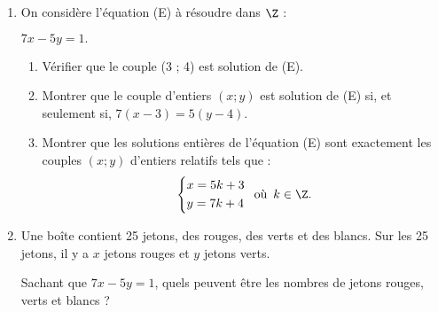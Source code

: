 \documentclass{cornouaille}
\begin{document}
\begin{exercice}
\begin{enumerate}
\item On considère l'équation (E) à résoudre dans $\Z$ :

{\centering $7x - 5y = 1.$\par}


\begin{enumerate}
\item Vérifier que le couple (3 ; 4) est solution de (E).
\item Montrer que le couple d'entiers $(x ; y)$ est solution de (E) si, et seulement si, $7(x - 3) = 5(y - 4)$.
\item Montrer que les solutions entières de l'équation (E) sont
  exactement les couples $(x ; y)$ d'entiers relatifs tels que :
$$\left\{\begin{aligned}
&x = 5k + 3\\
&y = 7k + 4\end{aligned}\right.\enskip \text{où}\enskip k\in\Z.$$
\end{enumerate}
\item Une boîte contient 25 jetons, des rouges, des verts et des
  blancs. Sur les 25 jetons, il y a $x$ jetons rouges et $y$
  jetons verts. 

  Sachant que $7x-5y = 1$, quels peuvent être les nombres de jetons
  rouges, verts et blancs ?
\end{enumerate}
\end{exercice}

\end{document}
